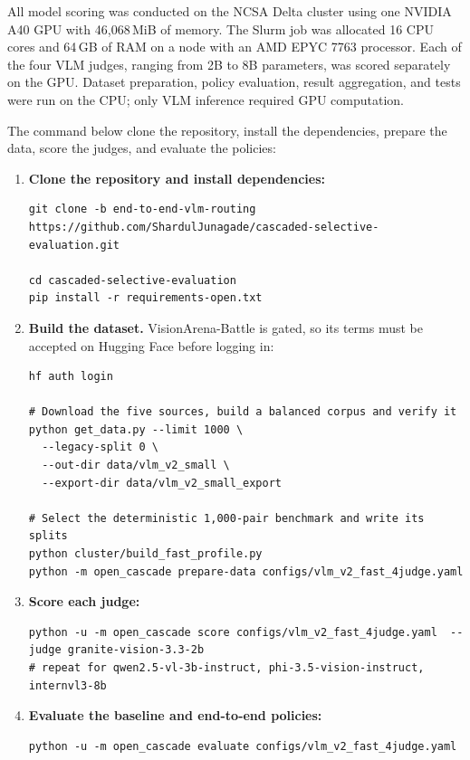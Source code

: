 \documentclass[11pt]{article}
\begin{document}
All model scoring was conducted on the NCSA Delta cluster using one NVIDIA
A40 GPU with 46,068\,MiB of memory. The Slurm job was allocated 16 CPU cores
and 64\,GB of RAM on a node with an AMD EPYC 7763 processor. Each of the four
VLM judges, ranging from 2B to 8B parameters, was scored separately on the
GPU. Dataset preparation, policy evaluation, result aggregation, and tests
were run on the CPU; only VLM inference required GPU computation.

The command below clone the repository, install the dependencies, prepare the data, score the judges, and evaluate the policies:

\begin{enumerate}[leftmargin=*]
    \item \textbf{Clone the repository and install dependencies:}
\begin{lstlisting}
git clone -b end-to-end-vlm-routing https://github.com/ShardulJunagade/cascaded-selective-evaluation.git

cd cascaded-selective-evaluation
pip install -r requirements-open.txt
\end{lstlisting}
    \item \textbf{Build the dataset.} VisionArena-Battle is gated, so its terms must be accepted on Hugging Face before logging in:
\begin{lstlisting}
hf auth login

# Download the five sources, build a balanced corpus and verify it
python get_data.py --limit 1000 \
  --legacy-split 0 \
  --out-dir data/vlm_v2_small \
  --export-dir data/vlm_v2_small_export
  
# Select the deterministic 1,000-pair benchmark and write its splits
python cluster/build_fast_profile.py
python -m open_cascade prepare-data configs/vlm_v2_fast_4judge.yaml
\end{lstlisting}

    \item \textbf{Score each judge:}
\begin{lstlisting}
python -u -m open_cascade score configs/vlm_v2_fast_4judge.yaml  --judge granite-vision-3.3-2b
# repeat for qwen2.5-vl-3b-instruct, phi-3.5-vision-instruct, internvl3-8b
\end{lstlisting}

    \item \textbf{Evaluate the baseline and end-to-end policies:}
\begin{lstlisting}
python -u -m open_cascade evaluate configs/vlm_v2_fast_4judge.yaml
\end{lstlisting}
\end{enumerate}
\end{document}
